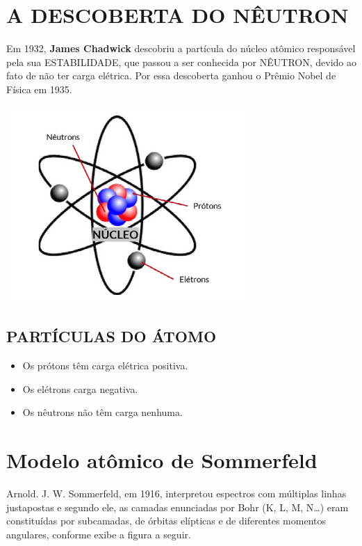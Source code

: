 \documentclass[10pt]{scrartcl}
\begin{document}
\section{A DESCOBERTA DO NÊUTRON}
\label{sec:org3377517}

Em 1932, \textbf{James Chadwick} descobriu a partícula do núcleo atômico responsável pela sua ESTABILIDADE, que passou a ser conhecida por NÊUTRON, devido ao fato de não ter carga elétrica. Por essa descoberta ganhou o Prêmio Nobel de Física em 1935.
\begin{center}
\includegraphics[width=.9\linewidth]{Quimica-Geral-Aula/atomo.png}
\end{center}

\subsection{PARTÍCULAS DO ÁTOMO}
\label{sec:org13ecce0}

\begin{itemize}
\item Os prótons têm carga elétrica positiva.
\item Os elétrons carga negativa.
\item Os nêutrons não têm carga nenhuma.
\end{itemize}
\section{Modelo atômico de Sommerfeld}
\label{sec:org5b72b75}

Arnold. J. W. Sommerfeld, em 1916, interpretou espectros com múltiplas linhas justapostas e segundo ele, as camadas enunciadas por Bohr (K, L, M, N\ldots{}) eram constituídas por subcamadas, de órbitas elípticas e de diferentes momentos angulares, conforme exibe a figura a seguir.
\end{document}
